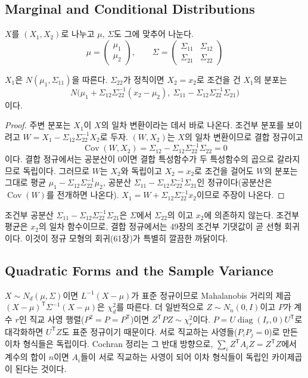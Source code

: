 \subsection{Marginal and Conditional Distributions}

$X$를 $(X_1,X_2)$로 나누고 $\mu$, $\Sigma$도 그에 맞추어 나눈다.
\[
\mu=\begin{pmatrix}\mu_1\\\mu_2\end{pmatrix},\qquad\Sigma=\begin{pmatrix}\Sigma_{11}&\Sigma_{12}\\\Sigma_{21}&\Sigma_{22}\end{pmatrix}
\]

\begin{proposition}
\label{prop:mvn-conditional}
$X_1$은 $N(\mu_1,\Sigma_{11})$을 따른다. $\Sigma_{22}$가 정칙이면 $X_2=x_2$로 조건을 건 $X_1$의 분포는
\[
N\bigl(\mu_1+\Sigma_{12}\Sigma_{22}^{-1}(x_2-\mu_2),\ \Sigma_{11}-\Sigma_{12}\Sigma_{22}^{-1}\Sigma_{21}\bigr)
\]
이다.
\end{proposition}

\begin{proof}
주변 분포는 $X_1$이 $X$의 일차 변환이라는 데서 바로 나온다. 조건부 분포를 보이려고 $W=X_1-\Sigma_{12}\Sigma_{22}^{-1}X_2$로 두자. $(W,X_2)$는 $X$의 일차 변환이므로 결합 정규이고
\[
\operatorname{Cov}(W,X_2)=\Sigma_{12}-\Sigma_{12}\Sigma_{22}^{-1}\Sigma_{22}=0
\]
이다. 결합 정규에서는 공분산이 $0$이면 결합 특성함수가 두 특성함수의 곱으로 갈라지므로 독립이다. 그러므로 $W$는 $X_2$와 독립이고 $X_2=x_2$로 조건을 걸어도 $W$의 분포는 그대로 평균 $\mu_1-\Sigma_{12}\Sigma_{22}^{-1}\mu_2$, 공분산 $\Sigma_{11}-\Sigma_{12}\Sigma_{22}^{-1}\Sigma_{21}$인 정규이다(공분산은 $\operatorname{Cov}(W)$를 전개하면 나온다). $X_1=W+\Sigma_{12}\Sigma_{22}^{-1}x_2$이므로 주장이 나온다.
\end{proof}

조건부 공분산 $\Sigma_{11}-\Sigma_{12}\Sigma_{22}^{-1}\Sigma_{21}$은 $\Sigma$에서 $\Sigma_{22}$의 이고 $x_2$에 의존하지 않는다. 조건부 평균은 $x_2$의 일차 함수이므로, 결합 정규에서는 49장의 조건부 기댓값이 곧 선형 회귀이다. 이것이 정규 모형의 회귀(61장)가 특별히 깔끔한 까닭이다.

\subsection{Quadratic Forms and the Sample Variance}

$X\sim N_d(\mu,\Sigma)$이면 $L^{-1}(X-\mu)$가 표준 정규이므로 Mahalanobis 거리의 제곱 $(X-\mu)^{\mathsf T}\Sigma^{-1}(X-\mu)$은 $\chi^2_d$를 따른다. 더 일반적으로 $Z\sim N_n(0,I)$이고 $P$가 계수 $r$인 직교 사영 행렬($P^2=P=P^{\mathsf T}$)이면 $Z^{\mathsf T}PZ\sim\chi^2_r$이다. $P=U\operatorname{diag}(I_r,0)U^{\mathsf T}$로 대각화하면 $U^{\mathsf T}Z$도 표준 정규이기 때문이다. 서로 직교하는 사영들($P_iP_j=0$)로 만든 이차 형식들은 독립이다. Cochran 정리는 그 반대 방향으로, $\sum_iZ^{\mathsf T}A_iZ=Z^{\mathsf T}Z$에서 계수의 합이 $n$이면 $A_i$들이 서로 직교하는 사영이 되어 이차 형식들이 독립인 카이제곱이 된다는 것이다\cite{cochran1934}.

